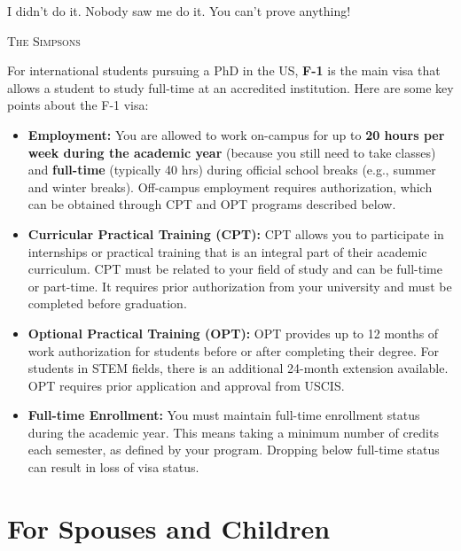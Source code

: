 \documentclass[oneside,11pt,dvipsnames]{book}
\begin{document}
\epigraph{\vspace{-0.2in} I didn’t do it. Nobody saw me do it. You can’t prove anything!}{\textsc{The Simpsons}}



For international students pursuing a PhD in the US, \textbf{F-1} is the main visa that allows a student to study full-time at an accredited institution.  Here are some key points about the F-1 visa:

\begin{itemize}
\item \textbf{Employment:} You are allowed to work on-campus for up to \textbf{20 hours per week during the academic year} (because you still need to take classes) and \textbf{full-time} (typically 40 hrs) during official school breaks (e.g., summer and winter breaks). Off-campus employment requires authorization, which can be obtained through CPT and OPT programs described below.

\item \textbf{Curricular Practical Training (CPT):} CPT allows you to participate in internships or practical training that is an integral part of their academic curriculum. CPT must be related to your field of study and can be full-time or part-time. It requires prior authorization from your university and must be completed before graduation.

\item \textbf{Optional Practical Training (OPT):} OPT provides up to 12 months of work authorization for students before or after completing their degree. For students in STEM fields, there is an additional 24-month extension available. OPT requires prior application and approval from USCIS.

\item \textbf{Full-time Enrollment:} You must maintain full-time enrollment status during the academic year. This means taking a minimum number of credits each semester, as defined by your program. Dropping below full-time status can result in loss of visa status.
\end{itemize}




\section{For Spouses and Children}
\end{document}
